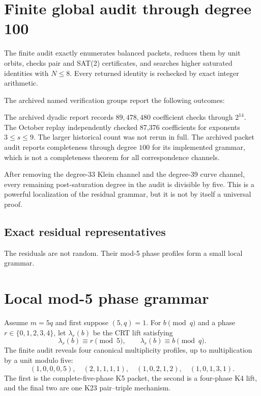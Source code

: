 \chapter{Finite global audit through degree 100}
The finite audit exactly enumerates balanced packets, reduces them by unit orbits, checks pair and SAT(2) certificates, and searches higher saturated identities with \(N\le8\). Every returned identity is rechecked by exact integer arithmetic.

The archived named verification groups report the following outcomes:
\begin{center}
\small

\end{center}
The archived dyadic report records \(89{,}478{,}480\) coefficient checks through \(2^{14}\). The October replay independently checked 87,376 coefficients for exponents $3\le s\le9$. The larger historical count was not rerun in full. The archived packet audit reports completeness through degree \(100\) for its implemented grammar, which is not a completeness theorem for all correspondence channels.

After removing the degree-33 Klein channel and the degree-39 curve channel, every remaining post-saturation degree in the audit is divisible by five. This is a powerful localization of the residual grammar, but it is not by itself a universal proof.



\section{Exact residual representatives}
\small

\normalsize

The residuals are not random. Their mod-5 phase profiles form a small local grammar.


\chapter{Local mod-5 phase grammar}
Assume \(m=5q\) and first suppose \((5,q)=1\). For \(b\pmod q\) and a phase \(r\in\{0,1,2,3,4\}\), let \(\lambda_r(b)\) be the CRT lift satisfying
\[
\lambda_r(b)\equiv r\pmod5,
\qquad
\lambda_r(b)\equiv b\pmod q.
\]
The finite audit reveals four canonical multiplicity profiles, up to multiplication by a unit modulo five:
\[
(1,0,0,0,5),
\quad
(2,1,1,1,1),
\quad
(1,0,2,1,2),
\quad
(1,0,1,3,1).
\]
The first is the complete-five-phase K5 packet, the second is a four-phase K4 lift, and the final two are one K23 pair--triple mechanism.




